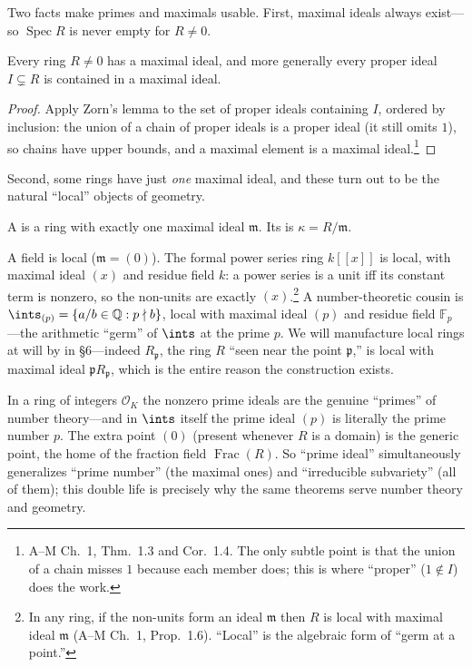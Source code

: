 \documentclass[11pt]{article}
\DeclareMathOperator{\Spec}{Spec}
\DeclareMathOperator{\Frac}{Frac}
\newcommand{\mfp}{\mathfrak{p}}
\newcommand{\mfm}{\mathfrak{m}}
\begin{document}
Two facts make primes and maximals usable. First, maximal ideals always exist---so $\Spec R$
is never empty for $R\neq 0$.

\begin{ttheorem}
Every ring $R\neq 0$ has a maximal ideal, and more generally every proper ideal $I\subsetneq R$
is contained in a maximal ideal.
\end{ttheorem}

\begin{proof}
Apply Zorn's lemma to the set of proper ideals containing $I$, ordered by inclusion: the union
of a chain of proper ideals is a proper ideal (it still omits $1$), so chains have upper
bounds, and a maximal element is a maximal ideal.\footnote{A--M Ch.~1, Thm.\ 1.3 and Cor.\
1.4. The only subtle point is that the union of a chain misses $1$ because each member does;
this is where ``proper'' ($1\notin I$) does the work.}
\end{proof}

Second, some rings have just \emph{one} maximal ideal, and these turn out to be the natural
``local'' objects of geometry.

\begin{ddefinition}
A  is a ring with exactly one maximal ideal $\mfm$. Its \vocab{residue
field} is $\kappa=R/\mfm$.
\end{ddefinition}

\begin{eexample}
A field is local ($\mfm=(0)$). The formal power series ring $k[[x]]$ is local, with maximal
ideal $(x)$ and residue field $k$: a power series is a unit iff its constant term is nonzero,
so the non-units are exactly $(x)$.\footnote{In any ring, if the non-units form an ideal
$\mfm$ then $R$ is local with maximal ideal $\mfm$ (A--M Ch.~1, Prop.\ 1.6). ``Local'' is the
algebraic form of ``germ at a point.''} A number-theoretic cousin is
$\ints_{(p)}=\{a/b\in\mathbb{Q}: p\nmid b\}$, local with maximal ideal $(p)$ and residue field
$\mathbb{F}_p$---the arithmetic ``germ'' of $\ints$ at the prime $p$. We will manufacture local
rings at will by \vocab{localization} in \S6---indeed $R_\mfp$, the ring $R$ ``seen near the
point $\mfp$,'' is local with maximal ideal $\mfp R_\mfp$, which is the entire reason the
construction exists.
\end{eexample}

\begin{nnote}
In a ring of integers $\mathcal{O}_K$ the nonzero prime ideals are the genuine ``primes'' of
number theory---and in $\ints$ itself the prime ideal $(p)$ is literally the prime number $p$.
The extra point $(0)$ (present whenever $R$ is a domain) is the generic point, the home of the
fraction field $\Frac(R)$. So ``prime ideal'' simultaneously generalizes ``prime number'' (the
maximal ones) and ``irreducible subvariety'' (all of them); this double life is precisely why
the same theorems serve number theory and geometry.
\end{nnote}
\end{document}
